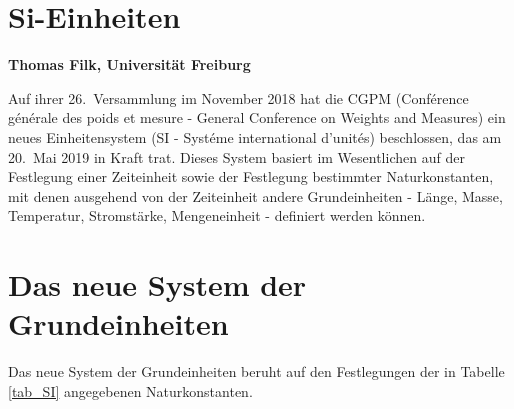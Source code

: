 
\setcounter{page}{1}
\setcounter{section}{0}
\setcounter{figure}{0}
\setcounter{equation}{0}
\setcounter{table}{0}
\setcounter{footnote}{0}

\section*{Si-Einheiten}
\vspace{0.2cm}
\noindent
{\bf Thomas Filk, Universit\"at Freiburg}
\vspace{1cm}

\label{chap_SI}

\noindent
Auf ihrer 26.\ Versammlung im November 2018 hat die CGPM (Conf\'{e}rence g\'{e}n\'{e}rale des poids et mesure -
General Conference on Weights and Measures)  
ein neues Einheitensystem (SI - Syst\'{e}me international d'unit\'{e}s) 
beschlossen, das am 20.\ Mai 2019 in Kraft trat. Dieses System basiert im Wesentlichen auf der
Festlegung einer Zeiteinheit sowie der Festlegung bestimmter Naturkonstanten, mit denen ausgehend von der
Zeiteinheit andere Grundeinheiten - L\"ange, Masse, Temperatur, Stromst\"arke, 
Mengeneinheit - definiert werden k\"onnen. 


\section{Das neue System der Grundeinheiten}

Das neue System der Grundeinheiten beruht auf den Festlegungen der in Tabelle \ref{tab_SI}
angegebenen Naturkonstanten.%
%
%

